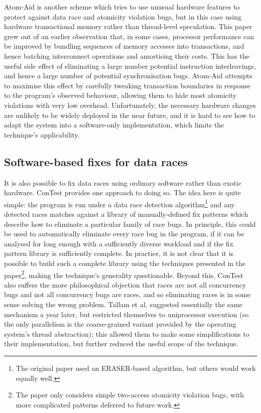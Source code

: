 Atom-Aid\cite{Lucia2009} is another scheme which tries to use unusual
hardware features to protect against data race and atomicity violation
bugs, but in this case using hardware transactional
memory\cite{Herlihy1993} rather than thread-level speculation.  This
paper grew out of an earlier observation that, in some cases,
processor performance can be improved by bundling sequences of memory
accesses into transactions, and hence batching interconnect operations
and amortising their costs\cite{Ceze2007}.  This has the useful side
effect of eliminating a large number potential instruction
interleavings, and hence a large number of potential synchronisation
bugs.  Atom-Aid attempts to maximise this effect by carefully tweaking
transaction boundaries in response to the program's observed
behaviour, allowing them to hide most atomicity violations with very
low overhead.  Unfortunately, the necessary hardware changes are
unlikely to be widely deployed in the near future, and it is hard to
see how to adapt the system into a software-only implementation, which
limits the technique's applicability.

\subsection{Software-based fixes for data races}
It is also possible to fix data races using ordinary software rather
than exotic hardware.  ConTest\cite{Krena2007} provides one approach
to doing so.  The idea here is quite simple: the program is run under
a data race detection algorithm\footnote{The original paper used an
  ERASER\cite{Savage1997}-based algorithm, but others would work
  equally well.} and any detected races matches against a library of
manually-defined fix patterns which describe how to eliminate a
particular family of race bugs.  In principle, this could be used to
automatically eliminate every race bug in the program, if it can be
analysed for long enough with a sufficiently diverse workload and if
the fix pattern library is sufficiently complete.  In practice, it is
not clear that it is possible to build such a complete library using
the techniques presented in the paper\footnote{The paper only
  considers simple two-access atomicity violation bugs, with more
  complicated patterns deferred to future work.}, making the
technique's generality questionable.  Beyond this, ConTest also
suffers the more philosophical objection that races are not all
concurrency bugs and not all concurrency bugs are races, and so
eliminating races is in some sense solving the wrong
problem.  Tallam et al.\cite{Tallam2008} suggested
essentially the same mechanism a year later, but restricted themselves
to uniprocessor execution (so the only parallelism is the
coarse-grained variant provided by the operating system's thread
abstraction); this allowed them to make some simplifications to their
implementation, but further reduced the useful scope of the technique.

